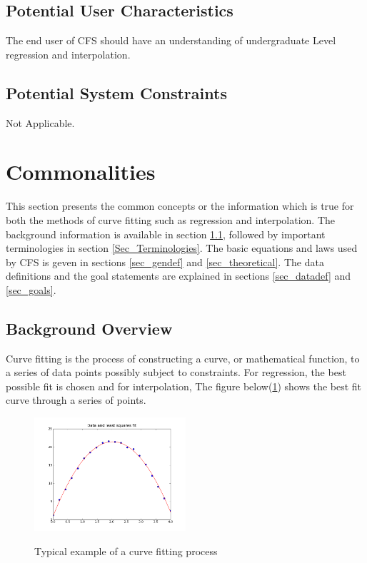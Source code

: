 \documentclass[12pt]{article}
\newcommand{\famname}{CFS} %
\begin{document}
\subsection{Potential User Characteristics} \label{SecUserCharacteristics}

The end user of \famname{} should have an understanding of undergraduate Level
regression and interpolation. 

\subsection{Potential System Constraints}

Not Applicable.

\section{Commonalities}

This section presents the common concepts or the information which is true for 
both the methods of curve fitting such as regression and interpolation. The 
background information is available in section \ref{Sec_Background}, followed 
by important terminologies in section \ref{Sec_Terminologies}. The basic 
equations and laws used by \famname{} is geven in sections \ref{sec_gendef} and 
\ref{sec_theoretical}. The data definitions and the goal statements are 
explained in sections \ref{sec_datadef} and \ref{sec_goals}.

\subsection{Background Overview} \label{Sec_Background}
Curve fitting is the process of constructing a curve, or mathematical function, 
to a series of data points possibly subject to constraints. For regression, the 
best possible fit is chosen and for interpolation,  The figure 
below(\ref{Fig_CurveFitEg}) shows the best fit curve through a series of 
points. 

\begin{figure}[h!]
	\begin{center}
		{
			\includegraphics[width=0.5\textwidth]{lstsq11.png}
		}
		\caption{\label{Fig_CurveFitEg} Typical example of a curve fitting process}
	\end{center}
\end{figure}
\end{document}
